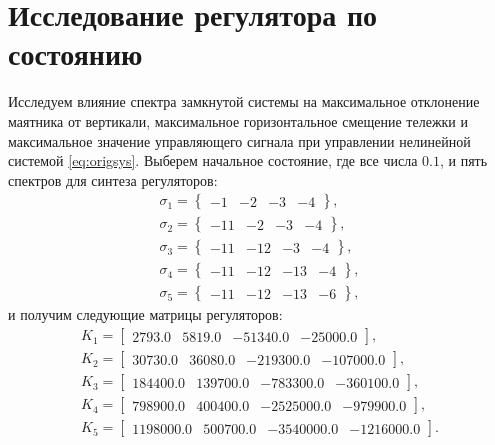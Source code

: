 \section{Исследование регулятора по состоянию}
\label{sec:3.2}
Исследуем влияние спектра замкнутой системы на максимальное отклонение 
маятника от вертикали, максимальное горизонтальное смещение тележки и 
максимальное значение управляющего сигнала
при управлении нелинейной системой \eqref{eq:origsys}.
Выберем начальное состояние, где все числа $0.1$, и пять спектров для
синтеза регуляторов:
\begin{gather*}
    \sigma_1=\left\{ \begin{array}{cccc}
        -1&-2&-3&-4
    \end{array} \right\},\\
    \sigma_2=\left\{ \begin{array}{cccc}
        -11&-2&-3&-4
    \end{array} \right\},\\
    \sigma_3=\left\{ \begin{array}{cccc}
        -11&-12&-3&-4
    \end{array} \right\},\\
    \sigma_4=\left\{ \begin{array}{cccc}
        -11&-12&-13&-4
    \end{array} \right\},\\
    \sigma_5=\left\{ \begin{array}{cccc}
        -11&-12&-13&-6
    \end{array} \right\},
\end{gather*}
и получим следующие матрицы регуляторов:
\begin{gather*}
    K_1=\begin{bmatrix}
        2793.0 & 5819.0 & -51340.0 & -25000.0
    \end{bmatrix},\\
    K_2=\begin{bmatrix}
        30730.0 & 36080.0 & -219300.0 & -107000.0
    \end{bmatrix},\\
    K_3=\begin{bmatrix}
        184400.0 & 139700.0 & -783300.0 & -360100.0
    \end{bmatrix},\\
    K_4=\begin{bmatrix}
        798900.0 & 400400.0 & -2525000.0 & -979900.0
    \end{bmatrix},\\
    K_5=\begin{bmatrix}
        1198000.0 & 500700.0 & -3540000.0 & -1216000.0
    \end{bmatrix}.
\end{gather*}
